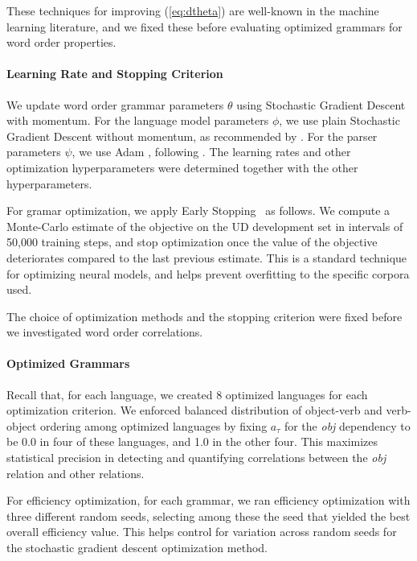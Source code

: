 \documentclass[10pt,twoside,lineno]{article}
\begin{document}
These techniques for improving (\ref{eq:dtheta}) are well-known in the machine learning literature, and we fixed these before evaluating optimized grammars for word order properties.

\paragraph{Learning Rate and Stopping Criterion}
We update word order grammar parameters $\theta$ using Stochastic Gradient Descent with momentum.
For the language model parameters $\phi$, we use plain Stochastic Gradient Descent without momentum, as recommended by \citet{merity2018regularizing}. 
For the parser parameters $\psi$, we use Adam \citep{kingma2014adam}, following \citet{dozat2017stanford}.
The learning rates and other optimization hyperparameters were determined together with the other hyperparameters.

For gramar optimization, we apply Early Stopping~\citep{prechelt1998early} as follows. We compute a Monte-Carlo estimate of the objective on the UD development set in intervals of 50,000 training steps, and stop optimization once the value of the objective deteriorates compared to the last previous estimate.
This is a standard technique for optimizing neural models, and helps prevent overfitting to the specific corpora used.

The choice of optimization methods and the stopping criterion were fixed before we investigated word order correlations.

\paragraph{Optimized Grammars}
Recall that, for each language, we created 8 optimized languages for each optimization criterion.
We enforced balanced distribution of object-verb and verb-object ordering among optimized languages by fixing $a_\tau$ for the \textit{obj} dependency to be 0.0 in four of these languages, and 1.0 in the other four.
This maximizes statistical precision in detecting and quantifying correlations between the \textit{obj} relation and other relations.

For efficiency optimization, for each grammar, we ran efficiency optimization with three different random seeds, selecting among these the seed that yielded the best overall efficiency value.
This helps control for variation across random seeds for the stochastic gradient descent optimization method.
\end{document}
